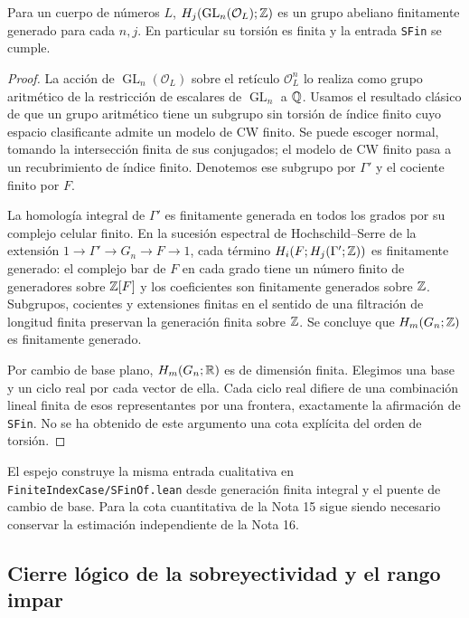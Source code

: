 \begin{proposicion}
\label{prop:ehi-fin}
Para un cuerpo de números $L$, $H_j(\operatorname{GL}_n(\mathcal O_L);\mathbb{Z})$ es un grupo abeliano finitamente generado para cada $n,j$. En particular su torsión es finita y la entrada \texttt{SFin} se cumple.
\end{proposicion}
\begin{proof}
La acción de $\operatorname{GL}_n(\mathcal O_L)$ sobre el retículo $\mathcal O_L^n$ lo realiza como grupo aritmético de la restricción de escalares de $\operatorname{GL}_n$ a $\mathbb{Q}$. Usamos el resultado clásico de que un grupo aritmético tiene un subgrupo sin torsión de índice finito cuyo espacio clasificante admite un modelo de CW finito. Se puede escoger normal, tomando la intersección finita de sus conjugados; el modelo de CW finito pasa a un recubrimiento de índice finito. Denotemos ese subgrupo por $\Gamma'$ y el cociente finito por $F$.

La homología integral de $\Gamma'$ es finitamente generada en todos los grados por su complejo celular finito. En la sucesión espectral de Hochschild--Serre de la extensión $1\to\Gamma'\to G_n\to F\to1$, cada término $H_i(F;H_j(\Gamma';\mathbb{Z}))$ es finitamente generado: el complejo bar de $F$ en cada grado tiene un número finito de generadores sobre $\mathbb{Z}[F]$ y los coeficientes son finitamente generados sobre $\mathbb{Z}$. Subgrupos, cocientes y extensiones finitas en el sentido de una filtración de longitud finita preservan la generación finita sobre $\mathbb{Z}$. Se concluye que $H_m(G_n;\mathbb{Z})$ es finitamente generado.

Por cambio de base plano, $H_m(G_n;\mathbb{R})$ es de dimensión finita. Elegimos una base y un ciclo real por cada vector de ella. Cada ciclo real difiere de una combinación lineal finita de esos representantes por una frontera, exactamente la afirmación de \texttt{SFin}. No se ha obtenido de este argumento una cota explícita del orden de torsión.
\end{proof}

El espejo construye la misma entrada cualitativa en \texttt{FiniteIndexCase/SFinOf.lean} desde generación finita integral y el puente de cambio de base. Para la cota cuantitativa de la Nota 15 sigue siendo necesario conservar la estimación independiente de la Nota 16.

\subsection{Cierre lógico de la sobreyectividad y el rango impar}

